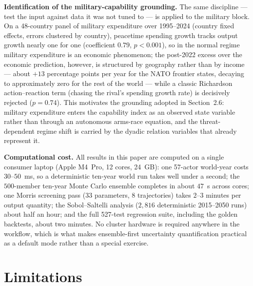 \documentclass[a4paper,fleqn]{cas-sc}
\begin{document}
\textbf{Identification of the military-capability grounding.} The same discipline --- test the
input against data it was not tuned to --- is applied to the military block. On a 48-country panel
of military expenditure over 1995--2024 (country fixed effects, errors clustered by country),
peacetime spending growth tracks output growth nearly one for one (coefficient $0.79$, $p<0.001$),
so in the normal regime military expenditure is an economic phenomenon; the post-2022 excess over
the economic prediction, however, is structured by geography rather than by income --- about $+13$
percentage points per year for the NATO frontier states, decaying to approximately zero for the
rest of the world --- while a classic Richardson action--reaction term (chasing the rival's
spending growth rate) is decisively rejected ($p=0.74$). This motivates the grounding adopted in
Section~2.6: military expenditure enters the capability index as an observed state variable rather
than through an autonomous arms-race equation, and the threat-dependent regime shift is carried by
the dyadic relation variables that already represent it.

\textbf{Computational cost.} All results in this paper are computed on a single consumer laptop
(Apple M4~Pro, 12 cores, 24~GB): one 57-actor world-year costs $30$--$50$~ms, so a deterministic
ten-year world run takes well under a second; the $500$-member ten-year Monte Carlo ensemble
completes in about $47$~s across cores; one Morris screening pass (33 parameters, 8 trajectories)
takes $2$--$3$ minutes per output quantity; the Sobol--Saltelli analysis ($2{,}816$ deterministic
2015--2050 runs) about half an hour; and the full 527-test regression suite, including the golden
backtests, about two minutes. No cluster hardware is required anywhere in the workflow, which is
what makes ensemble-first uncertainty quantification practical as a default mode rather than a
special exercise.

\section{Limitations}
\label{sec:limits}

\end{document}
